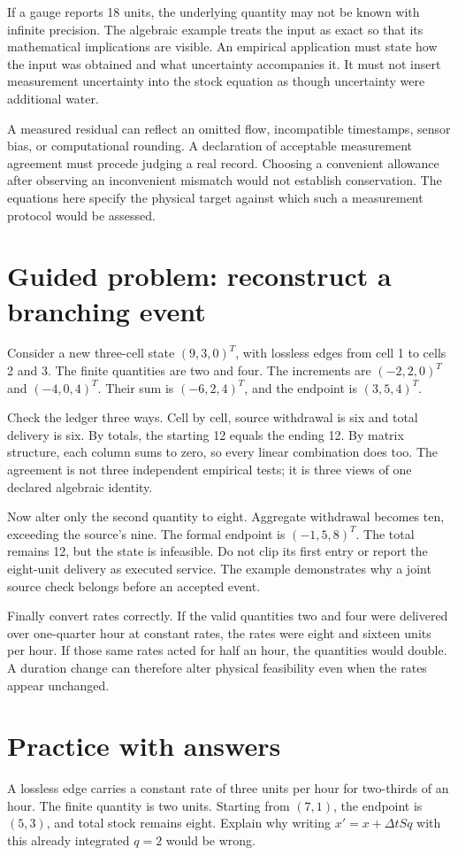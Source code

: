 If a gauge reports 18 units, the underlying quantity may not be known with infinite precision. The algebraic example treats the input as exact so that its mathematical implications are visible. An empirical application must state how the input was obtained and what uncertainty accompanies it. It must not insert measurement uncertainty into the stock equation as though uncertainty were additional water.

A measured residual can reflect an omitted flow, incompatible timestamps, sensor bias, or computational rounding. A declaration of acceptable measurement agreement must precede judging a real record. Choosing a convenient allowance after observing an inconvenient mismatch would not establish conservation. The equations here specify the physical target against which such a measurement protocol would be assessed.

\section{Guided problem: reconstruct a branching event}
Consider a new three-cell state \((9,3,0)^T\), with lossless edges from cell 1 to cells 2 and 3. The finite quantities are two and four. The increments are \((-2,2,0)^T\) and \((-4,0,4)^T\). Their sum is \((-6,2,4)^T\), and the endpoint is \((3,5,4)^T\).

Check the ledger three ways. Cell by cell, source withdrawal is six and total delivery is six. By totals, the starting 12 equals the ending 12. By matrix structure, each column sums to zero, so every linear combination does too. The agreement is not three independent empirical tests; it is three views of one declared algebraic identity.

Now alter only the second quantity to eight. Aggregate withdrawal becomes ten, exceeding the source's nine. The formal endpoint is \((-1,5,8)^T\). The total remains 12, but the state is infeasible. Do not clip its first entry or report the eight-unit delivery as executed service. The example demonstrates why a joint source check belongs before an accepted event.

Finally convert rates correctly. If the valid quantities two and four were delivered over one-quarter hour at constant rates, the rates were eight and sixteen units per hour. If those same rates acted for half an hour, the quantities would double. A duration change can therefore alter physical feasibility even when the rates appear unchanged.

\section{Practice with answers}
A lossless edge carries a constant rate of three units per hour for two-thirds of an hour. The finite quantity is two units. Starting from \((7,1)\), the endpoint is \((5,3)\), and total stock remains eight. Explain why writing \(x'=x+\Delta t S q\) with this already integrated \(q=2\) would be wrong.

